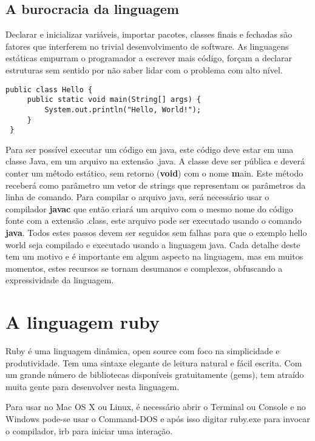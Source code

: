 \documentclass[espaco=simples,appendix=Name]{abnt}
\begin{document}
\section { A burocracia da linguagem }

Declarar e inicializar variáveis, importar pacotes, classes finais e fechadas são fatores que interferem no trivial desenvolvimento de software. As linguagens estáticas empurram o programador a escrever mais código, forçam a declarar estruturas sem sentido por não saber lidar com o problema com alto nível.

\begin{lstlisting}[label=HelloWorldJava, caption=Programa Hello World em Java]
 public class Hello {
     public static void main(String[] args) {
         System.out.println("Hello, World!");
     }
 }
\end{lstlisting}

Para ser possível executar um código em java, este código deve estar em uma classe Java, em um arquivo na extensão .java. A classe deve ser pública e deverá conter um método estático, sem retorno (\textbf{void}) com o nome \textbf main. Este método receberá como parâmetro um vetor de strings que representam os parâmetros da linha de comando. Para compilar o arquivo java, será necessário usar o compilador \textbf{javac} que então criará um arquivo com o mesmo nome do código fonte com a extensão .class, este arquivo pode ser executado usando o comando \textbf{java}. 
Todos estes passos devem ser seguidos sem falhas para que o exemplo hello world seja compilado e executado usando a linguagem java. Cada detalhe deste tem um motivo e é importante em algum aspecto na linguagem, mas em muitos momentos, estes recursos se tornam desumanos e complexos, obfuscando a expressividade da linguagem.

\chapter { A linguagem ruby }

Ruby é uma linguagem dinâmica, open source com foco na simplicidade e produtividade. Tem uma sintaxe elegante de leitura natural e fácil escrita. Com um grande número de bibliotecas disponíveis gratuitamente (gems), tem atraído muita gente para desenvolver nesta linguagem.

Para usar no Mac OS X ou Linux, é necessário abrir o {Terminal ou Console} e no Windows pode-se usar o Command-DOS e após isso digitar ruby.exe para invocar o compilador, irb para iniciar uma interação.
\end{document}
